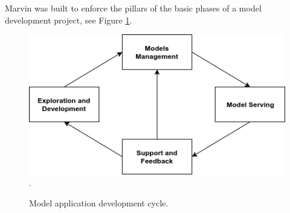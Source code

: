 \documentclass[twoside,11pt]{article}
\begin{document}
Marvin was built to enforce the pillars of the basic phases of a model development project, see Figure \ref{fig_cycle}.
\begin{figure}[h]
\centering
\includegraphics[scale=0.6]{fig/dev-cycle.png}
\DeclareGraphicsExtensions.
\caption{Model application development cycle.}
\label{fig_cycle}
\end{figure}
\end{document}
